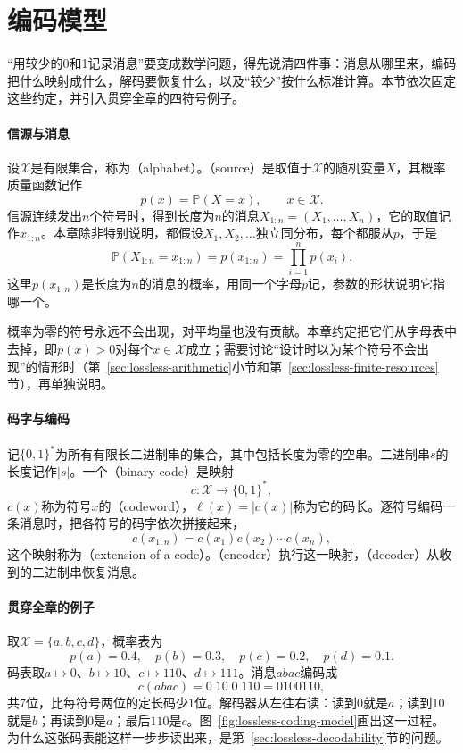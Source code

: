 \section{编码模型}
\label{sec:lossless-model}

“用较少的0和1记录消息”要变成数学问题，得先说清四件事：消息从哪里来，编码把什么映射成什么，解码要恢复什么，以及“较少”按什么标准计算。本节依次固定这些约定，并引入贯穿全章的四符号例子。

\paragraph{信源与消息}
设$\mathcal{X}$是有限集合，称为（alphabet）。（source）是取值于$\mathcal{X}$的随机变量$X$，其概率质量函数记作
\[
 p(x)=\mathbb{P}(X=x),\qquad x\in\mathcal{X}.
\]
信源连续发出$n$个符号时，得到长度为$n$的消息$X_{1:n}=(X_1,\dots,X_n)$，它的取值记作$x_{1:n}$。本章除非特别说明，都假设$X_1,X_2,\dots$独立同分布，每个都服从$p$，于是
\begin{equation}
 \mathbb{P}(X_{1:n}=x_{1:n})=p(x_{1:n})=\prod_{i=1}^{n}p(x_i).
 \label{eq:lossless-product}
\end{equation}
这里$p(x_{1:n})$是长度为$n$的消息的概率，用同一个字母$p$记，参数的形状说明它指哪一个。

概率为零的符号永远不会出现，对平均量也没有贡献。本章约定把它们从字母表中去掉，即$p(x)>0$对每个$x\in\mathcal{X}$成立；需要讨论“设计时以为某个符号不会出现”的情形时（第~\ref{sec:lossless-arithmetic}小节和第~\ref{sec:lossless-finite-resources}节），再单独说明。

\paragraph{码字与编码}
记$\{0,1\}^{*}$为所有有限长二进制串的集合，其中包括长度为零的空串。二进制串$s$的长度记作$\lvert s\rvert$。一个（binary code）是映射
\[
 c:\mathcal{X}\to\{0,1\}^{*},
\]
$c(x)$称为符号$x$的（codeword），$\ell(x)=\lvert c(x)\rvert$称为它的码长。逐符号编码一条消息时，把各符号的码字依次拼接起来，
\begin{equation}
 c(x_{1:n})=c(x_1)c(x_2)\cdots c(x_n),
 \label{eq:lossless-extension}
\end{equation}
这个映射称为（extension of a code）。（encoder）执行这一映射，（decoder）从收到的二进制串恢复消息。

\paragraph{贯穿全章的例子}
取$\mathcal{X}=\{a,b,c,d\}$，概率表为
\[
 p(a)=0.4,\quad p(b)=0.3,\quad p(c)=0.2,\quad p(d)=0.1 .
\]
码表取$a\mapsto0$、$b\mapsto10$、$c\mapsto110$、$d\mapsto111$。消息$abac$编码成
\[
 c(abac)=0\;10\;0\;110=0100110,
\]
共$7$位，比每符号两位的定长码少$1$位。解码器从左往右读：读到$0$就是$a$；读到$10$就是$b$；再读到$0$是$a$；最后$110$是$c$。图~\ref{fig:lossless-coding-model}画出这一过程。为什么这张码表能这样一步步读出来，是第~\ref{sec:lossless-decodability}节的问题。

